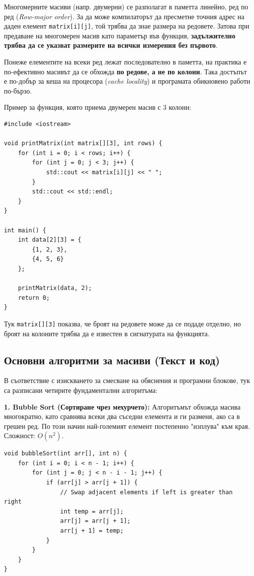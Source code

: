 \documentclass{scrartcl}
\begin{document}
\begin{FlushLeft}
Многомерните масиви (напр. двумерни) се разполагат в паметта линейно, ред по ред (\textit{Row-major order}). За да може компилаторът да пресметне точния адрес на даден елемент \texttt{matrix[i][j]}, той трябва да знае размера на редовете. Затова при предаване на многомерен масив като параметър във функция, \textbf{задължително трябва да се указват размерите на всички измерения без първото}.

Понеже елементите на всеки ред лежат последователно в паметта, на практика е по-ефективно масивът да се обхожда \textbf{по редове, а не по колони}. Така достъпът е по-добър за кеша на процесора (\textit{cache locality}) и програмата обикновено работи по-бързо.

Пример за функция, която приема двумерен масив с 3 колони:
\begin{lstlisting}
#include <iostream>

void printMatrix(int matrix[][3], int rows) {
    for (int i = 0; i < rows; i++) {
        for (int j = 0; j < 3; j++) {
            std::cout << matrix[i][j] << " ";
        }
        std::cout << std::endl;
    }
}

int main() {
    int data[2][3] = {
        {1, 2, 3},
        {4, 5, 6}
    };

    printMatrix(data, 2);
    return 0;
}
\end{lstlisting}

Тук \texttt{matrix[][3]} показва, че броят на редовете може да се подаде отделно, но броят на колоните трябва да е известен в сигнатурата на функцията.

\subsection{Основни алгоритми за масиви (Текст и код)}
В съответствие с изискването за смесване на обяснения и програмни блокове, тук са разписани четирите фундаментални алгоритъма:

\textbf{1. Bubble Sort (Сортиране чрез мехурчето):} Алгоритъмът обхожда масива многократно, като сравнява всеки два съседни елемента и ги разменя, ако са в грешен ред. По този начин най-големият елемент постепенно "изплува" към края. Сложност: $O(n^2)$.
\begin{lstlisting}
void bubbleSort(int arr[], int n) {
    for (int i = 0; i < n - 1; i++) {
        for (int j = 0; j < n - i - 1; j++) {
            if (arr[j] > arr[j + 1]) {
                // Swap adjacent elements if left is greater than right
                int temp = arr[j];
                arr[j] = arr[j + 1];
                arr[j + 1] = temp;
            }
        }
    }
}
\end{lstlisting}


\end{FlushLeft}
\end{document}
